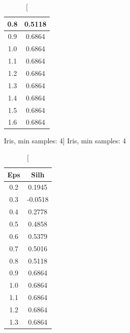 \documentclass{classrep}
\begin{document}
{{{\begin{table}[!htbp]
\begin{minipage}{.24\textwidth}
\begin{tabular}{|c|c|}
                            0.8 & 0.5118 \\ \hline
                            0.9 & 0.6864 \\ \hline
                            1.0 & 0.6864 \\ \hline
                            1.1 & 0.6864 \\ \hline
                            1.2 & 0.6864 \\ \hline
                            1.3 & 0.6864 \\ \hline
                            1.4 & 0.6864 \\ \hline
                            1.5 & 0.6864 \\ \hline
                            1.6 & 0.6864 \\ \hline
                        \end{tabular}
                        \caption
                        [Iris, min samples: 4]
                        {Iris, min samples: 4}
                        \label{db_scan_table_Iris_eucl_min_sample4}
                    \end{minipage}
                    \hfill
                    \begin{minipage}{.24\textwidth}
                        \centering
                        \begin{tabular}{|c|c|}
                            \hline
                            Eps & Silh \\ \hline
                            0.2 & 0.1945 \\ \hline
                            0.3 & -0.0518 \\ \hline
                            0.4 & 0.2778 \\ \hline
                            0.5 & 0.4858 \\ \hline
                            0.6 & 0.5379 \\ \hline
                            0.7 & 0.5016 \\ \hline
                            0.8 & 0.5118 \\ \hline
                            0.9 & 0.6864 \\ \hline
                            1.0 & 0.6864 \\ \hline
                            1.1 & 0.6864 \\ \hline
                            1.2 & 0.6864 \\ \hline
                            1.3 & 0.6864 \\ \hline

\end{tabular}
\end{minipage}
\end{table}}}}
\end{document}
